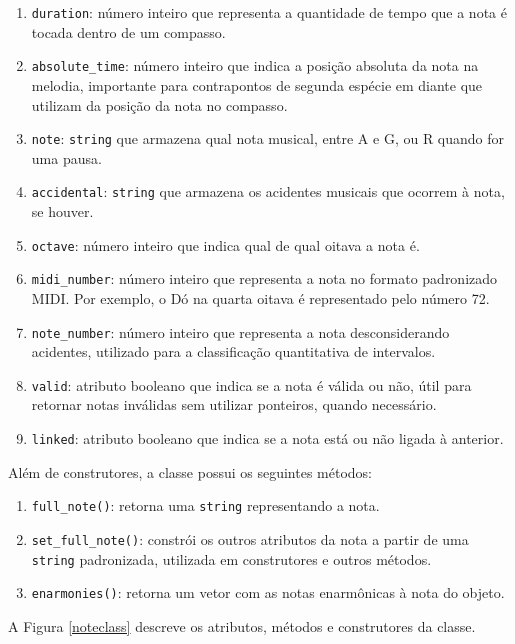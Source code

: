       \begin{enumerate}
        \item \texttt{duration}: número inteiro que representa a quantidade de tempo que a nota é tocada dentro de um compasso.
        \item \texttt{absolute\_time}: número inteiro que indica a posição absoluta da nota na melodia, importante para contrapontos de segunda espécie em diante que utilizam da posição da nota no compasso.
        \item \texttt{note}: \texttt{string} que armazena qual nota musical, entre A e G, ou R quando for uma pausa.
        \item \texttt{accidental}: \texttt{string} que armazena os acidentes musicais que ocorrem à nota, se houver.
        \item \texttt{octave}: número inteiro que indica qual de qual oitava a nota é.
        \item \texttt{midi\_number}: número inteiro que representa a nota no formato padronizado MIDI. Por exemplo, o Dó na quarta oitava é representado pelo número 72.
        \item \texttt{note\_number}: número inteiro que representa a nota desconsiderando acidentes, utilizado para a classificação quantitativa de intervalos.
        \item \texttt{valid}: atributo booleano que indica se a nota é válida ou não, útil para retornar notas inválidas sem utilizar ponteiros, quando necessário.
        \item \texttt{linked}: atributo booleano que indica se a nota está ou não ligada à anterior.
      \end{enumerate}

      Além de construtores, a classe possui os seguintes métodos:

      \begin{enumerate}
        \item \texttt{full\_note()}: retorna uma \texttt{string} representando a nota.
        \item \texttt{set\_full\_note()}: constrói os outros atributos da nota a partir de uma \texttt{string} padronizada, utilizada em construtores e outros métodos.
        \item \texttt{enarmonies()}: retorna um vetor com as notas enarmônicas à nota do objeto.
      \end{enumerate}

      A Figura \ref{noteclass} descreve os atributos, métodos e construtores da classe.


